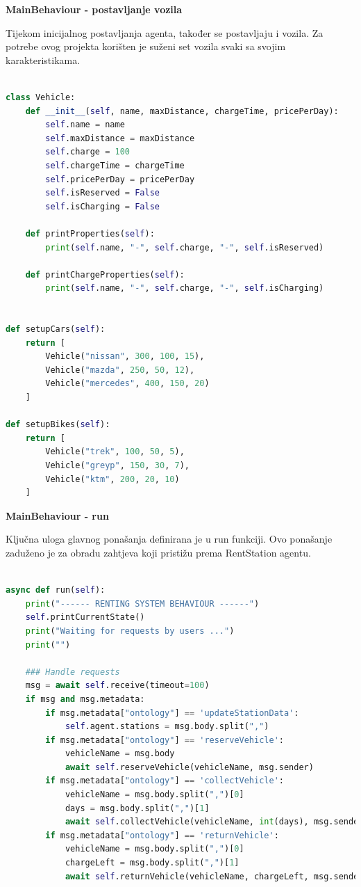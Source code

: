 \documentclass{foi}
\begin{document}
\begin{flushleft}\textbf{MainBehaviour - postavljanje vozila}\end{flushleft}

Tijekom inicijalnog postavljanja agenta, također se postavljaju i vozila. Za potrebe ovog projekta korišten je suženi set vozila svaki sa svojim karakteristikama.

\begin{lstlisting}[language=Python]

class Vehicle:
	def __init__(self, name, maxDistance, chargeTime, pricePerDay):
		self.name = name
		self.maxDistance = maxDistance
		self.charge = 100
		self.chargeTime = chargeTime
		self.pricePerDay = pricePerDay
		self.isReserved = False
		self.isCharging = False

	def printProperties(self): 
		print(self.name, "-", self.charge, "-", self.isReserved)
	
	def printChargeProperties(self): 
		print(self.name, "-", self.charge, "-", self.isCharging)


def setupCars(self):
	return [
		Vehicle("nissan", 300, 100, 15),
		Vehicle("mazda", 250, 50, 12),
		Vehicle("mercedes", 400, 150, 20)
	]

def setupBikes(self):
	return [
		Vehicle("trek", 100, 50, 5),
		Vehicle("greyp", 150, 30, 7),
		Vehicle("ktm", 200, 20, 10)
	]
\end{lstlisting}

\begin{flushleft}\textbf{MainBehaviour - run}\end{flushleft}

Ključna uloga glavnog ponašanja definirana je u run funkciji. Ovo ponašanje zaduženo je za obradu zahtjeva koji pristižu prema RentStation agentu.

\begin{lstlisting}[language=Python]

async def run(self):
	print("------ RENTING SYSTEM BEHAVIOUR ------")
	self.printCurrentState()
	print("Waiting for requests by users ...")
	print("")

	### Handle requests
	msg = await self.receive(timeout=100)
	if msg and msg.metadata:
		if msg.metadata["ontology"] == 'updateStationData':
			self.agent.stations = msg.body.split(",")
		if msg.metadata["ontology"] == 'reserveVehicle':
			vehicleName = msg.body
			await self.reserveVehicle(vehicleName, msg.sender)
		if msg.metadata["ontology"] == 'collectVehicle':
			vehicleName = msg.body.split(",")[0]
			days = msg.body.split(",")[1]
			await self.collectVehicle(vehicleName, int(days), msg.sender)
		if msg.metadata["ontology"] == 'returnVehicle':
			vehicleName = msg.body.split(",")[0]
			chargeLeft = msg.body.split(",")[1]
			await self.returnVehicle(vehicleName, chargeLeft, msg.sender)

\end{lstlisting}
\end{document}
